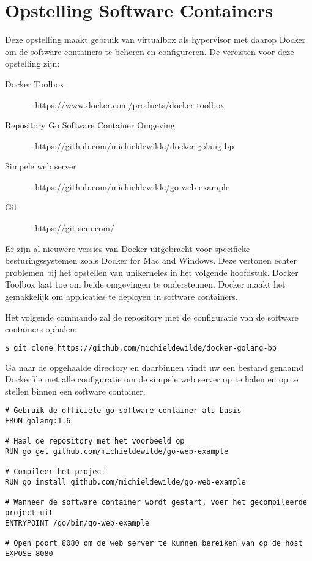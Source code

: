 \section{Opstelling Software Containers}

Deze opstelling maakt gebruik van virtualbox als hypervisor met daarop Docker om de software containers te beheren en configureren.
De vereisten voor deze opstelling zijn:
\begin{description}
\item [Docker Toolbox] - https://www.docker.com/products/docker-toolbox
\item [Repository Go Software Container Omgeving] - https://github.com/michieldewilde/docker-golang-bp
\item [Simpele web server] - https://github.com/michieldewilde/go-web-example
\item [Git] - https://git-scm.com/
\end{description}

Er zijn al nieuwere versies van Docker uitgebracht voor specifieke besturingssystemen zoals Docker for Mac and Windows. Deze vertonen echter problemen bij het opstellen van unikerneles in het volgende hoofdstuk. Docker Toolbox laat toe om beide omgevingen te ondersteunen. Docker maakt het gemakkelijk om applicaties te deployen in software containers.

\noindent Het volgende commando zal de repository met de configuratie van de software containers ophalen:
\begin{lstlisting}[language=bash]
  $ git clone https://github.com/michieldewilde/docker-golang-bp
\end{lstlisting}

Ga naar de opgehaalde directory en daarbinnen vindt uw een bestand genaamd Dockerfile met alle configuratie om de simpele web server op te halen en op te stellen binnen een software container.

\begin{lstlisting}[language=docker,caption={Dockerfile},breaklines=true,label={code:docker}]
# Gebruik de officiële go software container als basis
FROM golang:1.6

# Haal de repository met het voorbeeld op
RUN go get github.com/michieldewilde/go-web-example

# Compileer het project
RUN go install github.com/michieldewilde/go-web-example

# Wanneer de software container wordt gestart, voer het gecompileerde project uit
ENTRYPOINT /go/bin/go-web-example

# Open poort 8080 om de web server te kunnen bereiken van op de host
EXPOSE 8080
\end{lstlisting}

